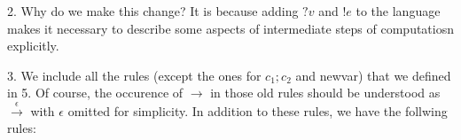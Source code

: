 \documentclass{report}[12pt]
\begin{document}
2. Why do we make this change? It is because adding $?v$ and $!e$ to the language makes it necessary to describe some aspects of intermediate steps of computatiosn explicitly.

3. We include all the rules (except the ones for $c_1; c_2$ and newvar) that we defined in 5. Of course, the occurence of $\rightarrow$ in those old rules should be understood as $\stackrel{\epsilon}{\rightarrow}$ with $\epsilon$ omitted for simplicity. In addition to these rules, we have the follwing rules:
{\center
\begin{prooftree}
\end{prooftree}\hspace{1cm}
\begin{prooftree}
\end{prooftree}

\vspace{1cm}

\begin{prooftree}
\end{prooftree} \hspace{1cm}
\begin{prooftree}
\end{prooftree}\hspace{1cm}
\begin{prooftree}
\end{prooftree}

\vspace{1cm}

\begin{prooftree}
\end{prooftree}

}
\end{document}
